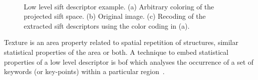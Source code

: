 \documentclass[a4paper, 10pt, conference]{llncs}      %
\begin{document}

\begin{figure}[Htbp]
\centering
{}~
\,
\caption{Low level \ac{sift} descriptor example. (a) Arbitrary coloring of the projected \acs{sift} space. (b) Original image. (c) Recoding of the extracted \ac{sift} descriptors using the color coding in (a). }
\label{fig:siftImg}
\end{figure}

Texture is an area property related to spatial repetition of structures, similar statistical properties of the area or both. A technique to embed statistical properties of a low level descriptor is \ac{bof} which analyses the occurrence of a set of keywords (or key-points) within a particular region~\cite{csurka2004visual}. 
\end{document}
